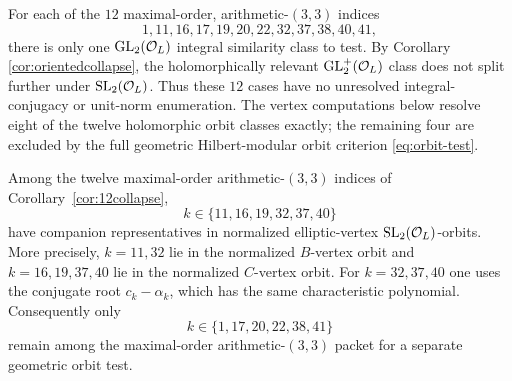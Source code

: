 \begin{corollary}[Sharp arithmetic reduction for the strongest $d=3$ candidates]\label{cor:12collapse}
For each of the $12$ maximal-order, arithmetic-$(3,3)$ indices
\[
 1,11,16,17,19,20,22,32,37,38,40,41,
\]
there is only one $\mathrm{GL}_2(\mathcal O_L)$ integral similarity class to test.  By
Corollary \ref{cor:orientedcollapse}, the holomorphically relevant
$\mathrm{GL}_2^+(\mathcal O_L)$ class does not split further under
$\mathrm{SL}_2(\mathcal O_L)$.  Thus these $12$ cases have no unresolved integral-conjugacy or
unit-norm enumeration.  The vertex computations below resolve eight of the twelve
holomorphic orbit classes exactly; the remaining four are excluded by the full
geometric Hilbert-modular orbit criterion \eqref{eq:orbit-test}.
\end{corollary}

\begin{proposition}\label{prop:sixvertexorbits}
Among the twelve maximal-order arithmetic-$(3,3)$ indices of Corollary~\ref{cor:12collapse},
\[
  k\in\{11,16,19,32,37,40\}
\]
have companion representatives in normalized elliptic-vertex
$\mathrm{SL}_2(\mathcal O_L)$-orbits.  More precisely, $k=11,32$ lie in the normalized $B$-vertex
orbit and $k=16,19,37,40$ lie in the normalized $C$-vertex orbit.  For $k=32,37,40$
one uses the conjugate root $c_k-\alpha_k$, which has the same characteristic polynomial.
Consequently only
\[
  k\in\{1,17,20,22,38,41\}
\]
remain among the maximal-order arithmetic-$(3,3)$ packet for a separate geometric orbit test.
\end{proposition}
